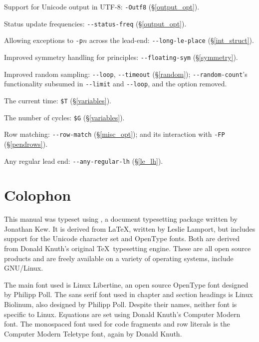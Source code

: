 \documentclass[a4paper,11pt,oneside]{book}
\newcommand{\sref}[1]{\hyperref[#1]{\S\ref{#1}}}
\begin{document}
\begin{list}{}{\leftmargin=1em\itemsep=0em}
\item Support for Unicode output in UTF-8: \verb+-Outf8+ (\sref{output_opt}).
\item Status update frequencies: \verb+--status-freq+ (\sref{output_opt}).
\item Allowing exceptions to \verb+-p+$n$ across the lead-end: 
  \verb+--long-le-place+ (\sref{int_struct}).
\item Improved symmetry handling for principles: 
  \verb+--floating-sym+ (\sref{symmetry}).
\item Improved random sampling: \verb+--loop+, \verb+--timeout+ 
  (\sref{random}); \verb+--random-count+'s functionality subsumed in
  \verb+--limit+ and \verb+--loop+, and the option removed.
\item The current time: \verb+$T+ (\sref{variables}).
\item The number of cycles: \verb+$G+ (\sref{variables}).
\item Row matching: \verb+--row-match+ (\sref{misc_opt}); and its
interaction with \verb+-FP+ (\sref{pendrows}).
\item Any regular lead end: \verb+--any-regular-lh+ (\sref{le_lh}).
\end{list}

\clearpage
{}
\footnotesize
{}

\normalsize
\chapter*{Colophon}

This manual was typeset using \XeTeX{}, a document 
typesetting package written by Jonathan Kew.  It is derived from 
\LaTeX, written by Leslie Lamport, but includes support for the Unicode 
character set and OpenType fonts.
Both are derived from Donald Knuth's original \TeX\ typesetting engine.  
These are all open source products and are freely available on a variety of 
operating systems, include GNU/Linux. 

The main font used is Linux Libertine, an open source OpenType font designed
by Philipp Poll.  The sans serif font used in chapter and section headings
is Linux Biolinum, also designed by Philipp Poll.  Despite their names,
neither font is specific to Linux.  Equations are set using Donald Knuth's 
Computer Modern font.  The monospaced font used for code fragments and
row literals is the Computer Modern Teletype font, again by Donald Knuth.%
\end{document}
